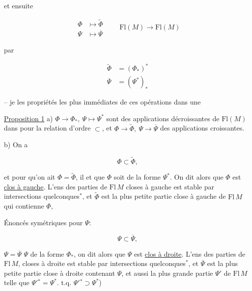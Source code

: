 et ensuite

\[ \boxed{\begin{aligned}\Phi&\longmapsto\widetilde\Phi\\ \Psi&\longmapsto\overline\Psi\end{aligned}}\qquad \mathrm{Fl}(M)\to\mathrm{Fl}(M) \]

par

\[ \begin{aligned}\widetilde\Phi&=(\Phi_*)^*\\ \overline\Psi&=(\Psi^*)_*\end{aligned} \]




-- je  les propriétés les plus immédiates de ces opérations dans une

\uline{Proposition 1} \quad a) $\Phi\to\Phi_*,\ \Psi\mapsto\Psi^*$ sont des applications décroissantes de $\mathrm{Fl}(M)$ dans  pour la relation d'ordre $\subset$, et $\Phi\to\widetilde\Phi,\ \Psi\to\overline\Psi$ des applications croissantes. 

b)  On a

\[ \Phi\subset\widetilde\Phi, \]

et pour qu'on ait $\Phi=\widetilde\Phi$, il  et  que $\Phi$ soit de la forme $\Psi^*$. On dit alors que $\Phi$ est \uline{clos à gauche}. \deleted{\unsure{\(\Phi\)}} L'ens des parties de $\mathrm{Fl}\,M$ closes à gauche est stable par intersections quelconques$^{*}$, et $\widetilde\Phi$ est la plus petite partie close à gauche de $\mathrm{Fl}\,M$ qui contienne $\Phi$, 



Énoncés symétriques pour $\Psi$: \unsure{$\ldots$}

\[ \Psi\subset\overline\Psi, \]

 $\Psi=\overline\Psi$  $\Psi$ de la forme $\Phi_*$, on dit alors que $\Psi$ est \uline{clos à droite}. L'ens des parties de $\mathrm{Fl}\,M$, closes à droite est stable par intersections quelconques$^*$, et $\overline\Psi$ est la plus petite partie close à droite contenant $\Psi$, et aussi la plus grande partie $\Psi'$ de $\mathrm{Fl}\,M$ telle que $\Psi'{}^*=\Psi^*$.  t.q. $\Psi'{}^*\supset\Psi^*$)

